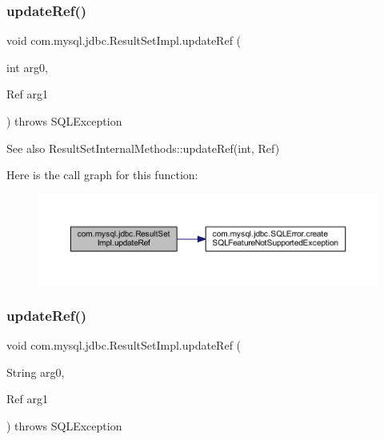 \subsubsection{\texorpdfstring{update\+Ref()}{updateRef()}\hspace{0.1cm}{\footnotesize\ttfamily [1/2]}}
{\footnotesize\ttfamily void com.\+mysql.\+jdbc.\+Result\+Set\+Impl.\+update\+Ref (\begin{DoxyParamCaption}\item[{int}]{arg0,  }\item[{Ref}]{arg1 }\end{DoxyParamCaption}) throws S\+Q\+L\+Exception}

\begin{DoxySeeAlso}{See also}
Result\+Set\+Internal\+Methods\+::update\+Ref(int, Ref) 
\end{DoxySeeAlso}
Here is the call graph for this function\+:
\nopagebreak
\begin{figure}[H]
\begin{center}
\leavevmode
\includegraphics[width=350pt]{classcom_1_1mysql_1_1jdbc_1_1_result_set_impl_a0d0258dbd474e1f0519f6d9e4166c9d3_cgraph}
\end{center}
\end{figure}
\mbox{\label{classcom_1_1mysql_1_1jdbc_1_1_result_set_impl_a8ccc94c8e83c3c560779aef0d9bab1ae}} 
\subsubsection{\texorpdfstring{update\+Ref()}{updateRef()}\hspace{0.1cm}{\footnotesize\ttfamily [2/2]}}
{\footnotesize\ttfamily void com.\+mysql.\+jdbc.\+Result\+Set\+Impl.\+update\+Ref (\begin{DoxyParamCaption}\item[{String}]{arg0,  }\item[{Ref}]{arg1 }\end{DoxyParamCaption}) throws S\+Q\+L\+Exception}

